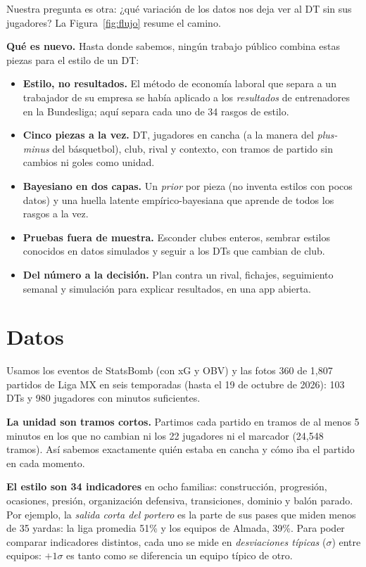 \documentclass[10pt,a4paper,twocolumn]{article}
\begin{document}
Nuestra pregunta es otra: ¿qué variación de los datos nos deja ver al DT sin sus jugadores? La Figura~\ref{fig:flujo} resume el camino.

\textbf{Qué es nuevo.} Hasta donde sabemos, ningún trabajo público combina estas piezas para el estilo de un DT:
\begin{itemize}\setlength\itemsep{1pt}
\item \textbf{Estilo, no resultados.} El método de economía laboral que separa a un trabajador de su empresa se había aplicado a los \emph{resultados} de entrenadores en la Bundesliga; aquí separa cada uno de 34 rasgos de estilo.
\item \textbf{Cinco piezas a la vez.} DT, jugadores en cancha (a la manera del \emph{plus-minus} del básquetbol), club, rival y contexto, con tramos de partido sin cambios ni goles como unidad.
\item \textbf{Bayesiano en dos capas.} Un \emph{prior} por pieza (no inventa estilos con pocos datos) y una huella latente empírico-bayesiana que aprende de todos los rasgos a la vez.
\item \textbf{Pruebas fuera de muestra.} Esconder clubes enteros, sembrar estilos conocidos en datos simulados y seguir a los DTs que cambian de club.
\item \textbf{Del número a la decisión.} Plan contra un rival, fichajes, seguimiento semanal y simulación para explicar resultados, en una app abierta.
\end{itemize}



\section{Datos}
Usamos los eventos de StatsBomb (con xG y OBV) y las fotos 360 de 1,807 partidos de Liga MX en seis temporadas (hasta el 19 de octubre de 2026): 103 DTs y 980 jugadores con minutos suficientes.

\textbf{La unidad son tramos cortos.} Partimos cada partido en tramos de al menos 5 minutos en los que no cambian ni los 22 jugadores ni el marcador (24,548 tramos). Así sabemos exactamente quién estaba en cancha y cómo iba el partido en cada momento.

\textbf{El estilo son 34 indicadores} en ocho familias: construcción, progresión, ocasiones, presión, organización defensiva, transiciones, dominio y balón parado. Por ejemplo, la \emph{salida corta del portero} es la parte de sus pases que miden menos de 35 yardas: la liga promedia 51\% y los equipos de Almada, 39\%. Para poder comparar indicadores distintos, cada uno se mide en \emph{desviaciones típicas} ($\sigma$) entre equipos: $+1\sigma$ es tanto como se diferencia un equipo típico de otro.
\end{document}
